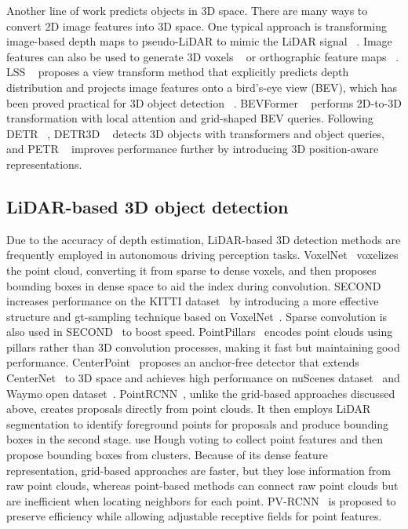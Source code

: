 \documentclass[twocolumn,letterpaper]{article}
\begin{document}
Another line of work predicts objects in 3D space. There are many ways to convert 2D image features into 3D space. One typical approach is transforming image-based depth maps to pseudo-LiDAR to mimic the LiDAR signal ~\cite{wang2019pseudo, you2019pseudo, qian2020end}. Image features can also be used to generate 3D voxels ~\cite{rukhovich2022imvoxelnet} or orthographic feature maps ~\cite{roddick2018orthographic}. LSS ~\cite{philion2020lift} proposes a view transform method that explicitly predicts depth distribution and projects image features onto a bird's-eye view (BEV), which has been proved practical for 3D object detection ~\cite{reading2021categorical, huang2021bevdet, huang2022bevdet4d}. BEVFormer ~\cite{li2022bevformer} performs 2D-to-3D transformation with local attention and grid-shaped BEV queries. Following DETR ~\cite{carion2020end}, DETR3D ~\cite{wang2022detr3d} detects 3D objects with transformers and object queries, and PETR ~\cite{liu2022petr} improves performance further by introducing 3D position-aware representations.

\subsection{LiDAR-based 3D object detection}

Due to the accuracy of depth estimation, LiDAR-based 3D detection methods are frequently employed in autonomous driving perception tasks. VoxelNet~\cite{zhou2018voxelnet} voxelizes the point cloud, converting it from sparse to dense voxels, and then proposes bounding boxes in dense space to aid the index during convolution.
SECOND~\cite{yan2018second} increases performance on the KITTI dataset~\cite{geiger2012we} by introducing a more effective structure and gt-sampling technique based on VoxelNet~\cite{zhou2018voxelnet}. Sparse convolution is also used in SECOND~\cite{yan2018second} to boost speed. PointPillars~\cite{lang2019pointpillars} encodes point clouds using pillars rather than 3D convolution processes, making it fast but maintaining good performance.
CenterPoint~\cite{yin2021center} proposes an anchor-free detector that extends CenterNet~\cite{zhou2019objects} to 3D space and achieves high performance on nuScenes dataset~\cite{caesar2020nuscenes} and Waymo open dataset~\cite{sun2020scalability}. PointRCNN~\cite{shi2019pointrcnn}, unlike the grid-based approaches discussed above, creates proposals directly from point clouds. It then employs LiDAR segmentation to identify foreground points for proposals and produce bounding boxes in the second stage. \cite{qi2019deep,yang2022dbq} use Hough voting to collect point features and then propose bounding boxes from clusters. Because of its dense feature representation, grid-based approaches are faster, but they lose information from raw point clouds, whereas point-based methods can connect raw point clouds but are inefficient when locating neighbors for each point. PV-RCNN~\cite{shi2020pv} is proposed to preserve efficiency while allowing adjustable receptive fields for point features.
\end{document}
